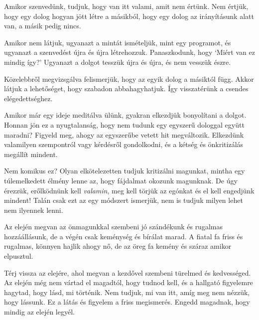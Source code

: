 
Amikor szenvedünk, tudjuk, hogy van itt valami, amit nem értünk. Nem
értjük, hogy egy dolog hogyan jött létre a másikból, hogy egy dolog az
irányításunk alatt van, a másik pedig nincs.

Amikor nem látjuk, ugyanazt a mintát ismételjük, mint egy programot, és
ugyanazt a szenvedést újra és újra létrehozzuk. Panaszkodunk, hogy
`Miért van ez mindig így?' Ugyanazt a dolgot tesszük újra és újra, és
nem vesszük észre.

Közelebbről megvizsgálva felismerjük, hogy az egyik dolog a másiktól
függ. Akkor látjuk a lehetőséget, hogy szabadon abbahagyhatjuk. Így
visszatérünk a csendes elégedettséghez.


Amikor már egy ideje meditálva ülünk, gyakran elkezdjük bonyolítani a
dolgot. Honnan jön ez a nyugtalanság, hogy nem tudunk egy egyszerű
dologgal együtt maradni? Figyeld meg, ahogy az egyszerűbe vetett hit
megváltozik. Elkezdünk valamilyen szempontról vagy kérdésről
gondolkodni, és a kétség és önkritizálás megállít mindent.

\enlargethispage*{\baselineskip}

Nem komikus ez? Olyan elkötelezetten tudjuk kritizálni magunkat, mintha
egy túlemelkedett élmény lenne az, hogy fájdalmat okozunk magunknak. De
úgy érezzük, erőlködnünk kell \emph{valamin}, meg kell törjük az egónkat
és el kell engedjünk mindent! Talán csak ezt az egy módszert ismerjük,
nem is tudjuk milyen lehet nem ilyennek lenni.

Az elején megvan az önmagunkkal szembeni jó szándékunk és rugalmas
hozzáállásunk, de a végén csak keménység és bírálat marad. A fiatal fa
friss és rugalmas, könnyen hajlik ahogy nő, de az öreg fa kemény és
száraz amikor elpusztul.

Térj vissza az elejére, ahol megvan a kezdővel szembeni türelmed és
kedvességed. Az elején még nem vártad el magadtól, hogy tudnod kell, és
a hallgató figyelemre hagytad, hogy lásd, mi történik. Nem tudjuk, mi
van itt, amíg meg nem nézzük, hogy lássunk. Ez a látás és figyelem a
friss megismerés. Engedd magadnak, hogy mindig az elején legyél.
